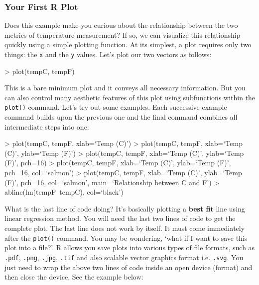 \documentclass[11pt,twosided]{article}
\begin{document}
\subsubsection{Your First R Plot}
Does this example make you curious about the relationship between the two metrics of temperature measurement?  If so, we can visualize this relationship quickly using a simple plotting function.  At its simplest, a plot requires only two things: the {\tt x} and the {\tt y} values.  Let's plot our two vectors as follows:\\

\begin{tcolorbox}[boxrule=0.5pt]
\begin{code}
> plot(tempC, tempF) 
\end{code}
\end{tcolorbox}
\vspace{2ex}

This is a bare minimum plot and it conveys all necessary information.  But you can also control many aesthetic features of this plot using subfunctions within the {\tt plot()} command.  Let's try out some examples.  Each successive example command builds upon the previous one and the final command combines all intermediate steps into one:\\

\begin{tcolorbox}[breakable,boxrule=0.5pt,enhanced]
\begin{code}
> plot(tempC, tempF, xlab=`Temp (C)') 
> plot(tempC, tempF, xlab=`Temp (C)', ylab=`Temp (F)') 
> plot(tempC, tempF, xlab=`Temp (C)', ylab=`Temp (F)', pch=16) 
> plot(tempC, tempF, xlab=`Temp (C)', ylab=`Temp (F)', pch=16, col=`salmon') 
> plot(tempC, tempF, xlab=`Temp (C)', ylab=`Temp (F)', pch=16, col=`salmon', 
  main=`Relationship between C and F') 
> abline(lm(tempF~tempC), col=`black')
\end{code}
\end{tcolorbox}
\vspace{2ex}

What is the last line of code doing?  It's basically plotting a {\bf best fit} line using linear regression method.  You will need the last two lines of code to get the complete plot.  The last line does not work by itself.  It must come immediately after the {\tt plot()} command.  You may be wondering, `what if I want to save this plot into a file?'.  R allows you save plots into various types of file formats, such as {\tt .pdf}, {\tt .png}, {\tt .jpg}, {\tt .tif} and also scalable vector graphics format i.e. {\tt .svg}.  You just need to wrap the above two lines of code inside an open device (format) and then close the device.  See the example below:\\
\end{document}
